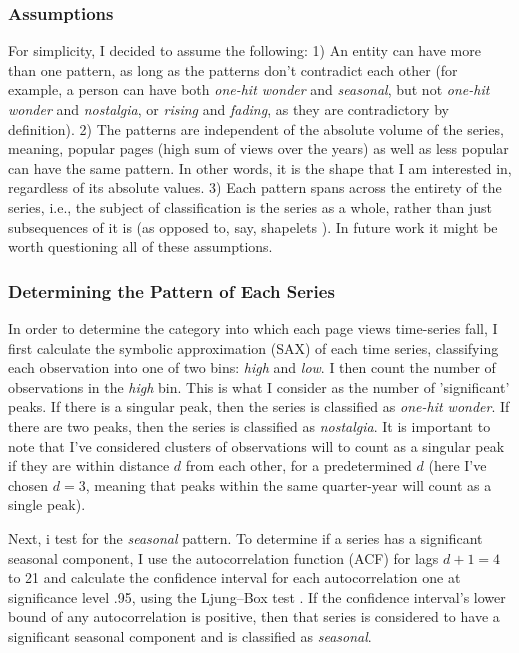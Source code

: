 \documentclass[titlepage]{article}
\newcommand{\ohw}{\textit{one-hit wonder}\xspace}
\newcommand{\nos}{\textit{nostalgia}\xspace}
\newcommand{\sea}{\textit{seasonal}\xspace}
\newcommand{\ris}{\textit{rising}\xspace}
\newcommand{\fad}{\textit{fading}\xspace}
\begin{document}
\subsubsection{Assumptions}
For simplicity, I decided to assume the following: 1) An entity can have more than one pattern, as long as the patterns don't contradict each other (for example, a person can have both \ohw and \sea, but not \ohw and \nos, or \ris and \fad, as they are contradictory by definition). 2) The patterns are independent of the absolute volume of the series, meaning, popular pages (high sum of views over the years) as well as less popular can have the same pattern. In other words, it is the shape that I am interested in, regardless of its absolute values. 3) Each pattern spans across the entirety of the series, i.e., the subject of classification is the series as a whole, rather than just subsequences of it is (as opposed to, say, shapelets \cite{yeTimeSeriesShapelets2009}). In future work it might be worth questioning all of these assumptions.


\subsubsection{Determining the Pattern of Each Series \label{section:pattern-determination}}
In order to determine the category into which each page views time-series fall, I first calculate the symbolic approximation (SAX) of each time series, classifying each observation into one of two bins: \textit{high} and \textit{low}. I then count the number of observations in the \textit{high} bin. This is what I consider as the number of 'significant' peaks. If there is a singular peak, then the series is classified as \textit{one-hit wonder}. If there are two peaks, then the series is classified as \textit{nostalgia}. It is important to note that I've considered clusters of observations will to count as a singular peak if they are within distance $d$ from each other, for a predetermined $d$ (here I've chosen $d = 3$, meaning that peaks within the same quarter-year will count as a single peak).

Next, i test for the \textit{seasonal} pattern. To determine if a series has a significant seasonal component, I use the autocorrelation function (ACF) for lags $d + 1 = 4$ to 21 and calculate the confidence interval for each autocorrelation one at significance level .95, using the Ljung–Box test \cite{ljungMeasureLackFit1978}. If the confidence interval's lower bound of any autocorrelation is positive, then that series is considered to have a significant seasonal component and is classified as \textit{seasonal}.
\end{document}
